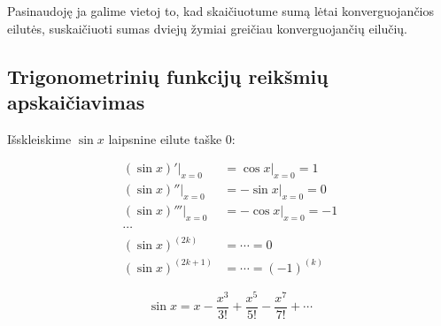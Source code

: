 Pasinaudoję ja galime vietoj to, kad skaičiuotume sumą lėtai 
konverguojančios eilutės, suskaičiuoti sumas dviejų žymiai greičiau
konverguojančių eilučių.

\subsection{Trigonometrinių funkcijų reikšmių apskaičiavimas}

Išskleiskime $\sin x$ laipsnine eilute taške $0$:

\begin{align*}
  (\sin x)'|_{x=0} &= \cos x|_{x=0} = 1 \\
  (\sin x)''|_{x=0} &= -\sin x|_{x=0} = 0 \\
  (\sin x)''' |_{x=0} &= -\cos x|_{x=0} = -1 \\
  \cdots \\
  (\sin x)^{(2k)} &= \cdots = 0 \\
  (\sin x)^{(2k+1)} &= \cdots = (-1)^{(k)}
\end{align*}

\begin{equation}
  \sin x = x - \frac{x^3}{3!} + \frac{x^5}{5!} - \frac{x^7}{7!} + \cdots
  \label{sin_1}
\end{equation}


